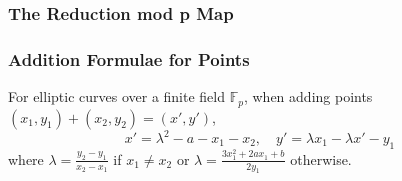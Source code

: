 \subsubsection{The Reduction mod p Map}
\lipsum[1-3]
\subsubsection{Addition Formulae for Points}
For elliptic curves over a finite field $\mathbb{F}_p$, when adding points $(x_1,y_1) + (x_2,y_2) = (x',y')$,
$$x'=\lambda^2 - a - x_1 - x_2,\quad y' = \lambda x_1 -\lambda x' - y_1 $$
where $\lambda = \frac{y_2-y_1}{x_2-x_1}$ if $x_1\neq x_2$ or $\lambda=\frac{3x_1^2 + 2ax_1 + b}{2y_1}$ otherwise.
